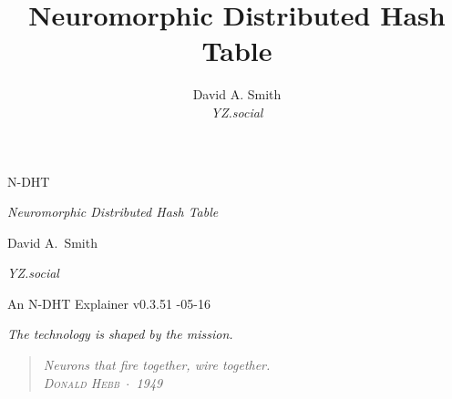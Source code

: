\documentclass[nobib]{tufte-handout}
\title{Neuromorphic Distributed Hash Table}
\author[David A. Smith]{David A. Smith \\[0.3em] \emph{\small YZ.social}}
\date{}
\begin{document}

\thispagestyle{empty}
\null\vfill
\begin{center}
{\fontsize{48}{52}\selectfont \textsc{N-DHT}\par}
\vspace{0.6em}
{\Large\itshape Neuromorphic Distributed Hash Table\par}
\vspace{4em}
{\large David A.~Smith\par}
{\itshape\small YZ.social\par}
\vspace{2em}
{\small An N-DHT Explainer \quad v0.3.51 -05-16\par}
\end{center}
\vfill
\null
\newpage

\thispagestyle{empty}
\null\vfill
\begin{flushright}
\itshape The technology is shaped by the mission.\par
\end{flushright}
\vfill
\null\newpage

\pagestyle{ndhtplain}
\thispagestyle{ndhtplain}
\setcounter{page}{1}

\begin{quote}
  \itshape Neurons that fire together, wire together.\\[0.3em]
  \normalfont\textsc{\footnotesize Donald Hebb} \,$\cdot$\, 1949
\end{quote}
\end{document}
